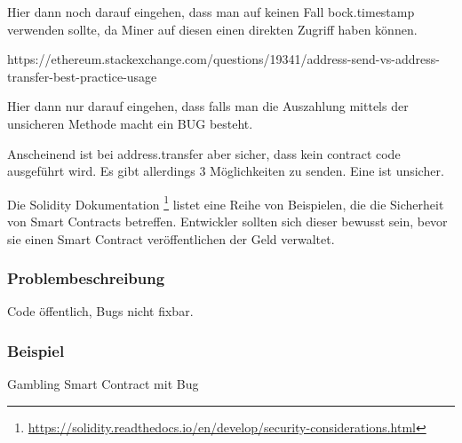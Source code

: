 Hier dann noch darauf eingehen, dass man auf keinen Fall bock.timestamp verwenden sollte, da Miner auf diesen einen direkten Zugriff haben können.

https://ethereum.stackexchange.com/questions/19341/address-send-vs-address-transfer-best-practice-usage

Hier dann nur darauf eingehen, dass falls man die Auszahlung mittels der unsicheren Methode macht ein BUG besteht. 

Anscheinend ist bei address.transfer aber sicher, dass kein contract code ausgeführt wird. Es gibt allerdings 3 Möglichkeiten zu senden.
Eine ist unsicher.



Die Solidity Dokumentation \footnote{\url{https://solidity.readthedocs.io/en/develop/security-considerations.html}} listet eine Reihe von Beispielen, die die Sicherheit von Smart Contracts betreffen. Entwickler sollten sich dieser bewusst sein, bevor sie einen Smart Contract veröffentlichen der Geld verwaltet.

\subsubsection{Problembeschreibung}
Code öffentlich, Bugs nicht fixbar.
\subsubsection{Beispiel}
Gambling Smart Contract mit Bug